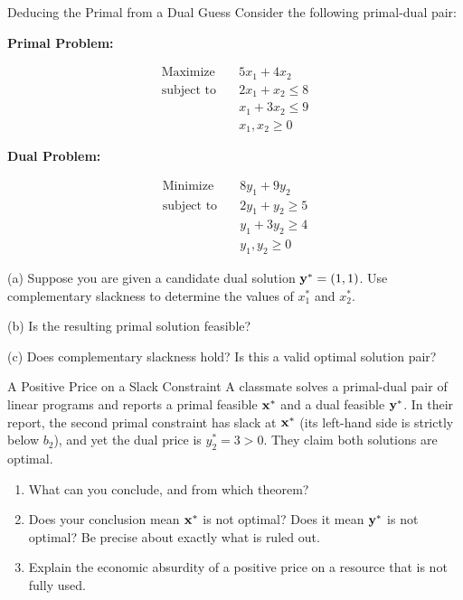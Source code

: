 \begin{ex}{Deducing the Primal from a Dual Guess}{}
\label{ex:cs-dual-guess}
 Consider the following primal-dual pair:

\textbf{Primal Problem:}

$$
\begin{aligned}
\text{Maximize} \quad & 5x_1 + 4x_2 \\
\text{subject to} \quad & 2x_1 + x_2 \leq 8 \\
& x_1 + 3x_2 \leq 9 \\
& x_1, x_2 \geq 0
\end{aligned}
$$

\textbf{Dual Problem:}

$$
\begin{aligned}
\text{Minimize} \quad & 8y_1 + 9y_2 \\
\text{subject to} \quad & 2y_1 + y_2 \geq 5 \\
& y_1 + 3y_2 \geq 4 \\
& y_1, y_2 \geq 0
\end{aligned}
$$

(a) Suppose you are given a candidate dual solution $\mathbf{y}^* = (1, 1)$. Use complementary slackness to determine the values of $x_1^*$ and $x_2^*$.

(b) Is the resulting primal solution feasible?

(c) Does complementary slackness hold? Is this a valid optimal solution pair?
\end{ex}


\begin{ex}{A Positive Price on a Slack Constraint}{}
 A classmate solves a primal-dual pair of linear programs and reports a primal feasible $\mathbf{x}^*$ and a dual feasible $\mathbf{y}^*$.  In their report, the second primal constraint has slack at $\mathbf{x}^*$ (its left-hand side is strictly below $b_2$), and yet the dual price is $y_2^* = 3 > 0$.  They claim both solutions are optimal.
\begin{enumerate}
\item What can you conclude, and from which theorem?
\item Does your conclusion mean $\mathbf{x}^*$ is not optimal? Does it mean $\mathbf{y}^*$ is not optimal? Be precise about exactly what is ruled out.
\item Explain the economic absurdity of a positive price on a resource that is not fully used.
\end{enumerate}
\end{ex}

